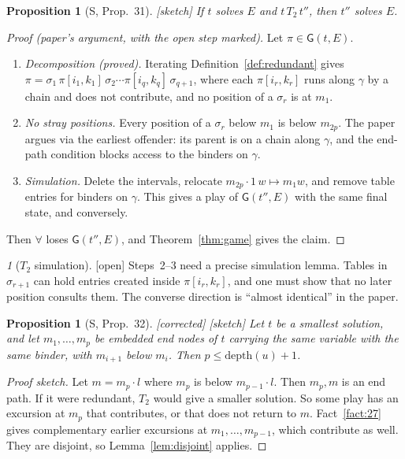 \documentclass[11pt]{article}
\newcommand{\depth}{\mathrm{depth}}
\newcommand{\Gm}{\mathsf{G}}
\newcommand{\suc}[2]{#1{\cdot}#2}
\newcommand{\iv}[2]{\pi[#1,#2]}
\newcommand{\Fixed}{\textsf{[corrected]}}
\newcommand{\Sketch}{\textsf{[sketch]}}
\newcommand{\Open}{\textsf{\color{red!60!black}[open]}}
\theoremstyle{plain}
\newtheorem{proposition}[theorem]{Proposition}
\theoremstyle{definition}
\theoremstyle{remark}
\newtheorem*{gapenv}{\gapname}
\newcommand{\gapname}{Gap}
\begin{document}
\begin{proposition}[S, Prop.~31]\label{prop:T2}
\Sketch{} If $t$ solves $E$ and $t\,T_2\,t''$, then $t''$ solves $E$.
\end{proposition}
\begin{proof}[Proof (paper's argument, with the open step marked)]
Let $\pi\in\Gm(t,E)$.
\begin{enumerate}
\item \emph{Decomposition (proved).} Iterating
  Definition~\ref{def:redundant} gives
  $\pi=\sigma_1\,\iv{i_1}{k_1}\,\sigma_2\cdots\iv{i_q}{k_q}\,\sigma_{q+1}$,
  where each $\iv{i_r}{k_r}$ runs along $\gamma$ by a chain and does not
  contribute, and no position of a $\sigma_r$ is at $m_1$.
\item \emph{No stray positions.} Every position of a $\sigma_r$ below
  $m_1$ is below $m_{2p}$.  The paper argues via the earliest offender:
  its parent is on a chain along $\gamma$, and the end-path condition
  blocks access to the binders on $\gamma$.
\item \emph{Simulation.} Delete the intervals, relocate
  $\suc{m_{2p}}1\,w\mapsto m_1w$, and remove table entries for binders on
  $\gamma$.  This gives a play of $\Gm(t'',E)$ with the same final state,
  and conversely.
\end{enumerate}
Then $\forall$ loses $\Gm(t'',E)$, and Theorem~\ref{thm:game} gives the
claim.
\end{proof}

\renewcommand{\gapname}{[Gap-$T_2$]}
\begin{gapenv}[$T_2$ simulation]\label{gap:T2}
\Open{} Steps~2--3 need a precise simulation lemma.  Tables in
$\sigma_{r+1}$ can hold entries created inside $\iv{i_r}{k_r}$, and one
must show that no later position consults them.  The converse direction
is ``almost identical'' in the paper.
\end{gapenv}

\begin{proposition}[S, Prop.~32]\label{prop:stacking}
\Fixed{} \Sketch{} Let $t$ be a smallest solution, and let
$m_1,\dots,m_p$ be embedded end nodes of $t$ carrying the same variable
with the same binder, with $m_{i+1}$ below $m_i$.  Then
$p\le\depth(u)+1$.
\end{proposition}
\begin{proof}[Proof sketch]
Let $m=\suc{m_p}l$ where $m_p$ is below $\suc{m_{p-1}}l$.  Then $m_p,m$
is an end path.  If it were redundant, $T_2$ would give a smaller
solution.  So some play has an excursion at $m_p$ that contributes, or
that does not return to $m$.  Fact~\ref{fact:27} gives complementary
earlier excursions at $m_1,\dots,m_{p-1}$, which contribute as well.
They are disjoint, so Lemma~\ref{lem:disjoint} applies.
\end{proof}
\end{document}
